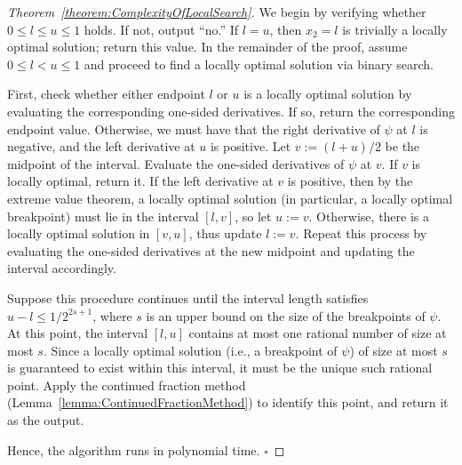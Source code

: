 \documentclass[runningheads,orivec]{llncs}
\newenvironment{Review}
  {\par\vspace{0.3cm} %
    \color{gray}\small
  }
  {
  }
\newcommand{\MacroColor}[1]{#1}
\newcommand{\MyQED}{\mbox{}\hfill$\square$}
\newcommand{\PartialOptValFunc}{\MacroColor{\psi}}
\begin{document}
\begin{appendix}
\begin{proof}[Theorem~\ref{theorem:ComplexityOfLocalSearch}]
We begin by verifying whether $0 \le l \le u \le 1$ holds.
If not, output ``no.''
If $l = u$, then $x_2 = l$ is trivially a locally optimal solution; return this value.
In the remainder of the proof, assume $0 \le l < u \le 1$ and proceed to find a locally optimal solution via binary search.

First, check whether either endpoint $l$ or $u$ is a locally optimal solution by evaluating the corresponding one-sided derivatives.
If so, return the corresponding endpoint value.
Otherwise, we must have that the right derivative of $\PartialOptValFunc$ at $l$ is negative, and the left derivative at $u$ is positive.
Let $v := (l + u)/2$ be the midpoint of the interval.
Evaluate the one-sided derivatives of $\PartialOptValFunc$ at $v$.
If $v$ is locally optimal, return it.
If the left derivative at $v$ is positive, then by the extreme value theorem, a locally optimal solution (in particular, a locally optimal breakpoint) must lie in the interval $[l, v]$, so let $u := v$.
Otherwise, there is a locally optimal solution in $[v, u]$, thus update $l := v$.
Repeat this process by evaluating the one-sided derivatives at the new midpoint and updating the interval accordingly.

Suppose this procedure continues until the interval length satisfies $u - l \le 1 / 2^{2s + 1}$, where $s$ is an upper bound on the size of the breakpoints of $\PartialOptValFunc$.
At this point, the interval $[l, u]$ contains at most one rational number of size at most $s$.
Since a locally optimal solution (i.e., a breakpoint of $\PartialOptValFunc$) of size at most $s$ is guaranteed to exist within this interval, it must be the unique such rational point.
Apply the continued fraction method (Lemma~\ref{lemma:ContinuedFractionMethod}) to identify this point, and return it as the output.

Hence, the algorithm runs in polynomial time.
\MyQED
\end{proof}






\end{appendix}
\end{document}
